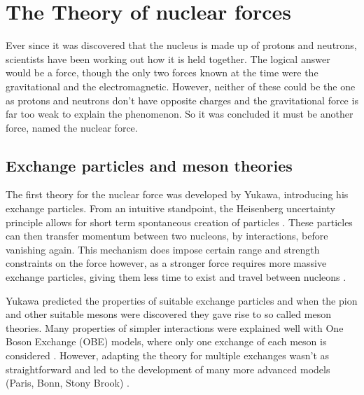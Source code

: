 \section{The Theory of nuclear forces}
Ever since it was discovered that the nucleus is made up of protons and neutrons, scientists have been working out how it is held together.
The logical answer would be a force, though the only two forces known at the time were the gravitational and the electromagnetic.
However, neither of these could be the one as protons and neutrons don't have opposite charges and the gravitational force is far too weak to explain the phenomenon.
So it was concluded it must be another force, named the nuclear force. \cite{hergert_guided_2020, machleidt_chiral_2011}


\subsection{Exchange particles and meson theories}
The first theory for the nuclear force was developed by Yukawa, introducing his exchange particles.
From an intuitive standpoint, the Heisenberg uncertainty principle allows for short term spontaneous creation of particles \cite{machleidt_nuclear_2013}.
These particles can then transfer momentum between two nucleons, by interactions, before vanishing again.
This mechanism does impose certain range and strength constraints on the force however, as a stronger force requires more massive exchange particles, giving them less time to exist and travel between nucleons \cite{machleidt_nuclear_2013, hergert_guided_2020}.

Yukawa predicted the properties of suitable exchange particles and when the pion and other suitable mesons were discovered they gave rise to so called meson theories. %
Many properties of simpler interactions were explained well with One Boson Exchange (OBE) models, where only one exchange of each meson is considered \cite{machleidt_nuclear_2013}.
However, adapting the theory for multiple exchanges wasn't as straightforward and led to the development of many more advanced models (Paris, Bonn, Stony Brook) \cite{machleidt_nuclear_2013, machleidt_meson_1989}.

